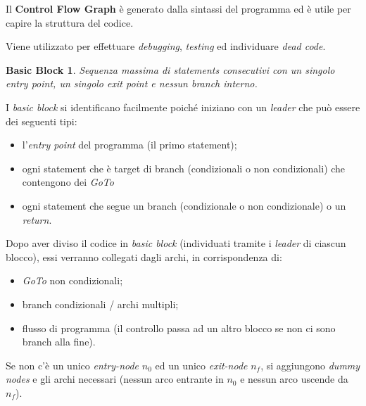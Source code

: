 \documentclass[a4paper, 11pt]{report}
\begin{document}
 Il \textbf{Control Flow Graph} è generato dalla sintassi del programma ed è utile per capire la struttura del codice.
 
 Viene utilizzato per effettuare \textit{debugging}, \textit{testing} ed individuare \textit{dead code}.
 
 \newtheorem*{definit1}{Basic Block}
 \begin{definit1}
	Sequenza massima di statements consecutivi con un singolo \textit{entry point}, un singolo \textit{exit point} e nessun \textit{branch} interno.
 \end{definit1}

I \textit{basic block} si identificano facilmente poiché iniziano con un \textit{leader} che può essere dei seguenti tipi:
\begin{itemize}
	\item l'\textit{entry point} del programma (il primo statement);
	\item ogni statement che è target di branch (condizionali o non condizionali) che contengono dei \textit{GoTo}
	\item ogni statement che segue un branch (condizionale o non condizionale) o un \textit{return}.
\end{itemize}

Dopo aver diviso il codice in \textit{basic block} (individuati tramite i \textit{leader} di ciascun blocco), essi verranno collegati dagli archi, in corrispondenza di:
\begin{itemize}
	\item \textit{GoTo} non condizionali;
	\item branch condizionali / archi multipli;
	\item flusso di programma (il controllo passa ad un altro blocco se non ci sono branch alla fine).
\end{itemize}

Se non c'è un unico \textit{entry-node} $n_0$ ed un unico \textit{exit-node} $n_f$, si aggiungono \textit{dummy nodes} e gli archi necessari (nessun arco entrante in $n_0$ e nessun arco uscende da $n_f$).
\end{document}
